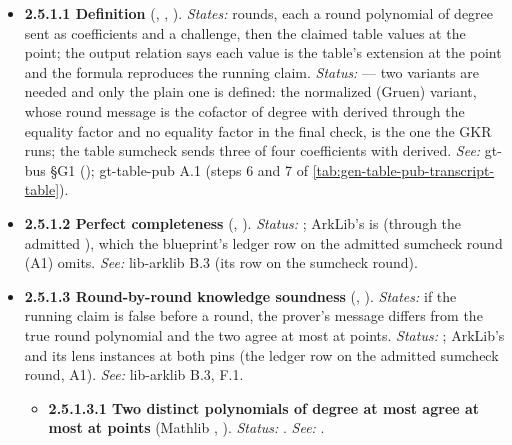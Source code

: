 \begin{itemize}[label={}, leftmargin=1.3em, itemindent=-1.3em, labelwidth=0pt, labelsep=0pt, itemsep=4pt, topsep=3pt]
\item {}\label{obl:node-2.5.1.1}\oblflag\textbf{2.5.1.1 Definition} (, , ). \emph{States:}  rounds, each a round polynomial of degree  sent as  coefficients and a challenge, then the claimed table values at the point; the output relation says each value is the table's extension at the point and the formula reproduces the running claim. \emph{Status:}   — two variants are needed and only the plain one is defined: the normalized (Gruen) variant, whose round message is the cofactor of degree  with  derived through the equality factor and no equality factor in the final check, is the one the GKR runs; the table sumcheck sends three of four coefficients with  derived. \emph{See:} gt-bus §G1 (); gt-table-pub A.1 (steps 6 and 7 of \cref{tab:gen-table-pub-transcript-table}).
\item {}\label{obl:node-2.5.1.2}\textbf{2.5.1.2 Perfect completeness} (, ). \emph{Status:} ; ArkLib's  is  (through the admitted ), which the blueprint's ledger row on the admitted sumcheck round (A1) omits. \emph{See:} lib-arklib B.3 (its row on the sumcheck round).
\item {}\label{obl:node-2.5.1.3}\textbf{2.5.1.3 Round-by-round knowledge soundness} (, ). \emph{States:} if the running claim is false before a round, the prover's message differs from the true round polynomial and the two agree at most at  points. \emph{Status:} ; ArkLib's  and its lens instances  at both pins (the ledger row on the admitted sumcheck round, A1). \emph{See:} lib-arklib B.3, F.1.
\begin{itemize}[label={}, leftmargin=1.3em, itemindent=-1.3em, labelwidth=0pt, labelsep=0pt, itemsep=4pt, topsep=3pt]
\item {}\label{obl:node-2.5.1.3.1}\textbf{2.5.1.3.1 Two distinct polynomials of degree at most  agree at most at  points} (Mathlib , ). \emph{Status:} . \emph{See:} .

\end{itemize}
\end{itemize}
